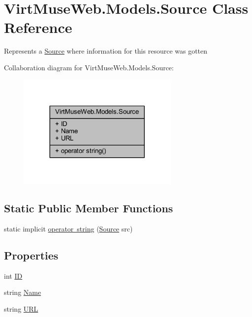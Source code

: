 \hypertarget{class_virt_muse_web_1_1_models_1_1_source}{}\section{Virt\+Muse\+Web.\+Models.\+Source Class Reference}
\label{class_virt_muse_web_1_1_models_1_1_source}


Represents a \mbox{\hyperlink{class_virt_muse_web_1_1_models_1_1_source}{Source}} where information for this resource was gotten  




Collaboration diagram for Virt\+Muse\+Web.\+Models.\+Source\+:
\nopagebreak
\begin{figure}[H]
\begin{center}
\leavevmode
\includegraphics[width=224pt]{class_virt_muse_web_1_1_models_1_1_source__coll__graph}
\end{center}
\end{figure}
\subsection*{Static Public Member Functions}
\begin{DoxyCompactItemize}
\item 
static implicit \mbox{\hyperlink{class_virt_muse_web_1_1_models_1_1_source_acd933e8a81cff0d4a66f271da6a7995d}{operator string}} (\mbox{\hyperlink{class_virt_muse_web_1_1_models_1_1_source}{Source}} src)
\end{DoxyCompactItemize}
\subsection*{Properties}
\begin{DoxyCompactItemize}
\item 
int \mbox{\hyperlink{class_virt_muse_web_1_1_models_1_1_source_a10ca9b78cbda18e52858594f92919d19}{ID}}
\item 
string \mbox{\hyperlink{class_virt_muse_web_1_1_models_1_1_source_a7e1487db24858ab8e3b7bd65e296bfb2}{Name}}
\item 
string \mbox{\hyperlink{class_virt_muse_web_1_1_models_1_1_source_a93f4b8e4e4c0997a2bcecb7e40b40f82}{U\+RL}}
\end{DoxyCompactItemize}


